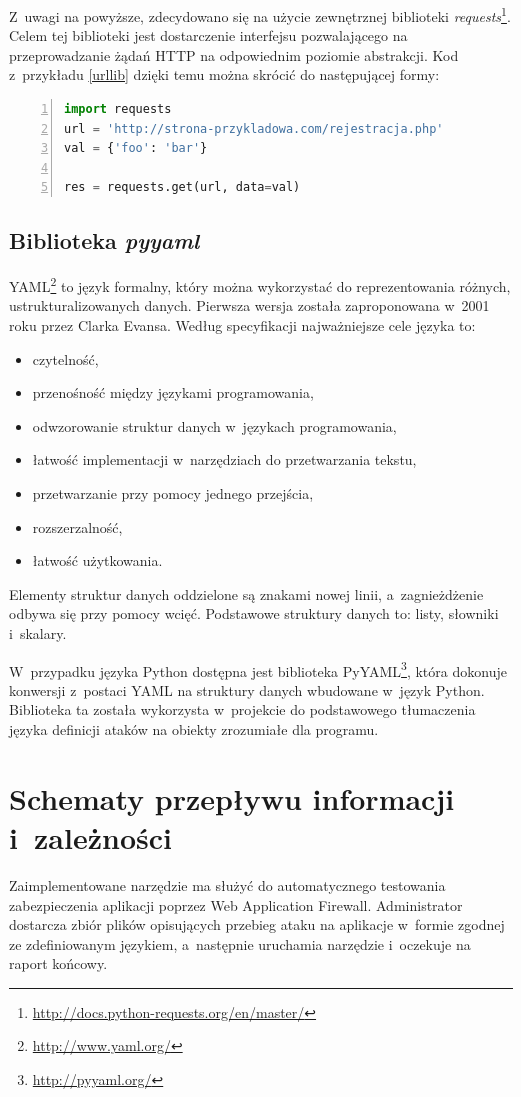 \documentclass[12pt,a4paper,polish,thesis]{dcsbook}
\begin{document}
 Z~uwagi na powyższe, zdecydowano się na użycie zewnętrznej biblioteki \textit{requests}\footnote{\url{http://docs.python-requests.org/en/master/}}. Celem tej biblioteki jest dostarczenie interfejsu pozwalającego na przeprowadzanie żądań HTTP na odpowiednim poziomie abstrakcji. Kod z~przykładu \ref{urllib} dzięki temu można skrócić do następującej formy:
\begin{lstlisting}[language=python,frame=single,label=req1,numbers=left]
import requests
url = 'http://strona-przykladowa.com/rejestracja.php'
val = {'foo': 'bar'}

res = requests.get(url, data=val)
\end{lstlisting}

\subsection{Biblioteka \textit{pyyaml}}
YAML\footnote{\url{http://www.yaml.org/}} to język formalny, który można wykorzystać do reprezentowania różnych, ustrukturalizowanych danych. Pierwsza wersja została zaproponowana w~2001 roku przez Clarka Evansa. Według specyfikacji \cite{yamlspec} najważniejsze cele języka to: 
\begin{itemize}
\item czytelność,
\item przenośność między językami programowania,
\item odwzorowanie struktur danych w~językach programowania,
\item łatwość implementacji w~narzędziach do przetwarzania tekstu,
\item przetwarzanie przy pomocy jednego przejścia,
\item rozszerzalność,
\item łatwość użytkowania.
\end{itemize}

Elementy struktur danych oddzielone są znakami nowej linii, a~zagnieżdżenie odbywa się przy pomocy wcięć. Podstawowe struktury danych to: listy, słowniki i~skalary.

 W~przypadku języka Python dostępna jest biblioteka PyYAML\footnote{\url{http://pyyaml.org/}}, która dokonuje konwersji z~postaci YAML na struktury danych wbudowane w~język Python. Biblioteka ta została wykorzysta w~projekcie do podstawowego tłumaczenia języka definicji ataków na obiekty zrozumiałe dla programu.

\section{Schematy przepływu informacji i~zależności}
Zaimplementowane narzędzie ma służyć do automatycznego testowania zabezpieczenia aplikacji poprzez Web Application Firewall. Administrator dostarcza zbiór plików opisujących przebieg ataku na aplikacje w~formie zgodnej ze zdefiniowanym językiem, a~następnie uruchamia narzędzie i~oczekuje na raport końcowy.
\end{document}
